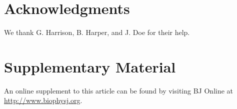 \documentclass{biophys-new}
\begin{document}
\section*{Acknowledgments}

We thank G. Harrison, B. Harper, and J. Doe for their help.




\section*{Supplementary Material}

An online supplement to this article can be found by visiting BJ Online at \url{http://www.biophysj.org}.
\end{document}
